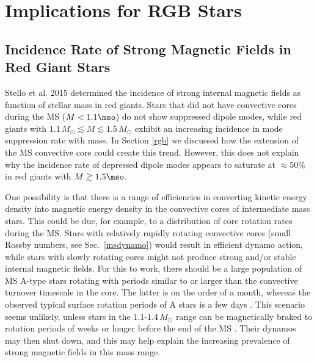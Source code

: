 \section{Implications for RGB Stars}
\subsection{Incidence Rate of Strong Magnetic Fields in Red Giant Stars}
Stello et al. 2015 determined the incidence of strong internal magnetic fields as function of stellar mass in red giants. Stars that did not have convective cores during the MS ($M<1.1\mso$) do not show suppressed dipole modes, while red giants with $1.1 \, M_\odot \lesssim M \lesssim 1.5 \, M_\odot$ exhibit an increasing incidence in mode suppression rate with mass. In Section \ref{rgb} we discussed how the extension of the MS convective core could create this trend. However, this does not explain why the incidence rate of depressed dipole modes appears to saturate at $\approx 50\%$ in red giants with $M \gtrsim 1.5 \mso$.

One possibility is that there is a range of efficiencies in converting kinetic energy density into magnetic energy density in the convective cores of intermediate mass stars. This could be due, for example, to a distribution of core rotation rates during the MS. Stars with relatively rapidly rotating convective cores (small Rossby numbers, see Sec.~\ref{msdynamo}) would result in efficient dynamo action, while stars with slowly rotating cores might not produce strong and/or stable internal magnetic fields. For this to work, there should be a large population of MS A-type stars rotating with periods similar to or larger than the convective turnover timescale in the core. The latter is on the order of a month, whereas the observed typical surface rotation periods of A stars is a few days \citep{Zorec_2012}.
This scenario seems unlikely, unless stars in the $1.1$-$1.4 \, M_\odot$ range can be magnetically braked to rotation periods of weeks or longer before the end of the MS \citep[see][]{VanSaders_2013}. Their dynamos may then shut down, and this may help explain the increasing prevalence of strong magnetic fields in this mass range.

